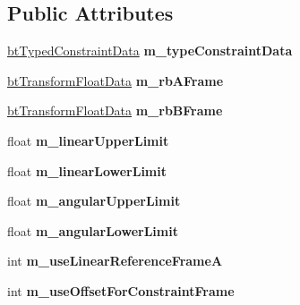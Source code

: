 \subsection*{Public Attributes}
\begin{DoxyCompactItemize}
\item 
\mbox{\label{structbtSliderConstraintData_abee506c97f8d5cd60401b30364e25f56}} 
\hyperlink{structbtTypedConstraintData}{bt\+Typed\+Constraint\+Data} {\bfseries m\+\_\+type\+Constraint\+Data}
\item 
\mbox{\label{structbtSliderConstraintData_ac171fecdaac9edea4c66fb56dcd2e93f}} 
\hyperlink{structbtTransformFloatData}{bt\+Transform\+Float\+Data} {\bfseries m\+\_\+rb\+A\+Frame}
\item 
\mbox{\label{structbtSliderConstraintData_aaefe2551ef9c1a81b19dede49faa6e41}} 
\hyperlink{structbtTransformFloatData}{bt\+Transform\+Float\+Data} {\bfseries m\+\_\+rb\+B\+Frame}
\item 
\mbox{\label{structbtSliderConstraintData_af06310538f6a206a31d7fef6402be756}} 
float {\bfseries m\+\_\+linear\+Upper\+Limit}
\item 
\mbox{\label{structbtSliderConstraintData_a739c108b3d3ced28c8bc4c2d8c2495cc}} 
float {\bfseries m\+\_\+linear\+Lower\+Limit}
\item 
\mbox{\label{structbtSliderConstraintData_a15fc2ecc90ff0c76865a5246e9a2dd6a}} 
float {\bfseries m\+\_\+angular\+Upper\+Limit}
\item 
\mbox{\label{structbtSliderConstraintData_abf8da57bde61967ea485362a1750b896}} 
float {\bfseries m\+\_\+angular\+Lower\+Limit}
\item 
\mbox{\label{structbtSliderConstraintData_a7ba7039cc70b833dfd54ed9f93b7bdb7}} 
int {\bfseries m\+\_\+use\+Linear\+Reference\+FrameA}
\item 
\mbox{\label{structbtSliderConstraintData_af172214c4ab3c78e4d18017d59b57d21}} 
int {\bfseries m\+\_\+use\+Offset\+For\+Constraint\+Frame}
\end{DoxyCompactItemize}


